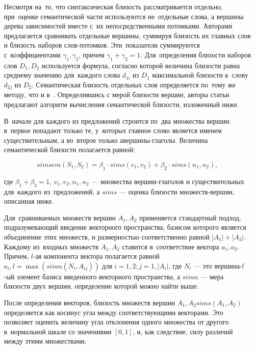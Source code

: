 Несмотря на~то, что синтаксическая близость рассматривается отдельно, 
при~оценке семантической части используются не~отдельные слова, 
а вершины дерева зависимостей вместе с~их непосредственными потомками.
Авторами предлагается сравнивать отдельные вершины, суммируя близость их главных слов и близость наборов слов-потомков. 
Эти~показатели суммируются с~коэффициентами $\gamma_1, \gamma_2$, 
причем $\gamma_1+\gamma_2=1$.
Для~определения близости наборов слов $D_1,D_2$ используется формула, 
согласно которой величина близости равна среднему значению для~каждого слова $d_{1i}$ из $D_1$ 
максимальной близости к~слову $d_{{2j}}$  из $D_2$. 
Семантическая близость отдельных слов определяется по~тому же методу, что и в~\cite{wordnetSim}.
Определившись с мерой близости вершин, авторы статьи предлагают 
алгоритм вычисления семантической близости, изложенный ниже.

В~начале для каждого из предложений строится по~два множества вершин:
в~первое попадают только те, у~которых главное слово является именем существительным,
а во~второе только авершины-глаголы.
Величина семантической близости полагается равной:

$$simsem(S_1 , S_2) = \beta_1 \cdot sims(v_1, v_2) + \beta_2 \cdot sims(n_1, n_2), $$

где 
$\beta_1 + \beta_2 = 1$, 
$v_1, v_2, n_1, n_2$ --- множества вершин-глаголов и существительных для~каждого из~предложений,
а $sims$ --- оценка близости множеств-вершин, описанная ниже.

Для~сравниваемых множеств вершин $A_1,A_2$ применяется стандартный подход,
подразумевающий введение векторного пространства, базисом которого является объединение этих множеств,
и размерностью соответственно равной $|A_1|+|A_2|$.  
Каждому из~входных множеств $A_1,A_2$ ставится в~соответствие вектора $a_1,a_2$.
Причем, $l$-ая компонента вектора полагается равной 
$a_i,l = \max(simn(N_l, A_{ij}))$ 
для $i=1,2; j=1,|A_i|$,
где $N_l$ --- это вершина-$l$-ый элемент базиса введенного векторного пространства, %
а $simn$ --- мера близости двух вершин, определение которой можно найти выше.

После определения векторов, близость множеств вершин $A_1,A_2 sims(A_1,A_2)$ определяется как 
косинус угла между соответствующими векторами. 
Это позволяет оценить величину угла отклонения одного множества от другого в~нормальной шкале
со значениями $[0,1]$, и, как следствие,
 силу различий между этими множествами.

